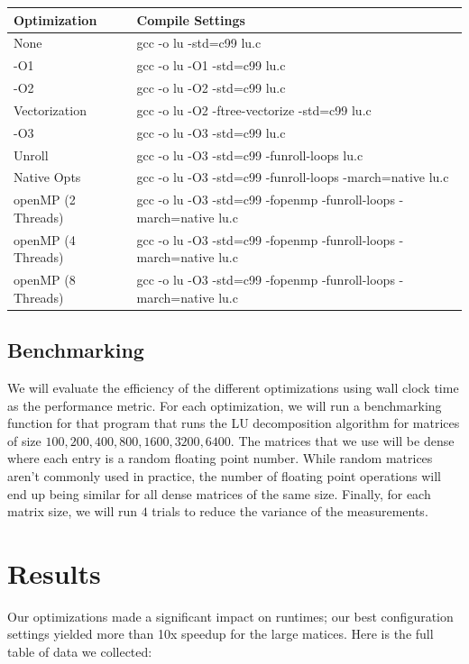 \documentclass[12]{article}
\begin{document}
\begin{center}
\begin{tabular}{|l|l|}
\hline
Optimization & Compile Settings \\
\hline
None & gcc -o lu -std=c99 lu.c \\
-O1 & gcc -o lu -O1  -std=c99 lu.c	 \\
-O2 & gcc -o lu -O2 -std=c99 lu.c \\
Vectorization & gcc -o lu -O2 -ftree-vectorize -std=c99 lu.c \\
-O3 & gcc -o lu -O3 -std=c99 lu.c	 \\
Unroll & gcc -o lu -O3 -std=c99 -funroll-loops lu.c \\
Native Opts & gcc -o lu -O3 -std=c99 -funroll-loops -march=native lu.c \\
openMP (2 Threads) & gcc -o lu -O3 -std=c99 -fopenmp -funroll-loops -march=native lu.c \\
openMP (4 Threads) & gcc -o lu -O3 -std=c99 -fopenmp -funroll-loops -march=native lu.c \\
openMP (8 Threads) & gcc -o lu -O3 -std=c99 -fopenmp -funroll-loops -march=native lu.c \\
\hline
\end{tabular}
\end{center}

\subsection{Benchmarking}

We will evaluate the efficiency of the different optimizations using wall clock time as the performance metric.  For each optimization, we will run a benchmarking function for that program that runs the LU decomposition algorithm for matrices of size $100,200,400,800,1600,3200,6400$.  The matrices that we use will be dense where each entry is a random floating point number.  While random matrices aren't commonly used in practice, the number of floating point operations will end up being similar for all dense matrices of the same size.  Finally, for each matrix size, we will run $4$ trials to reduce the variance of the measurements.

\section{Results}

Our optimizations made a significant impact on runtimes; our best configuration settings  yielded more than 10x speedup for the large matices.  Here is the full table of data we collected:
\end{document}
